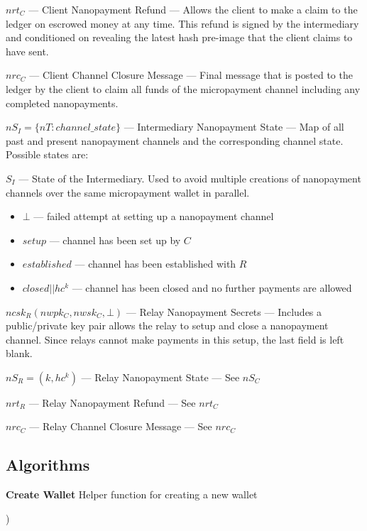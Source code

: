 $nrt_C$ --- Client Nanopayment Refund --- Allows the client to make a claim to the ledger on escrowed money at any time.
This refund is signed by the intermediary and conditioned on revealing the latest hash pre-image that the client claims to have sent.

$nrc_C$ --- Client Channel Closure Message --- Final message that is posted to the ledger by the client to claim all funds of the micropayment channel including any completed nanopayments.

$nS_I = \{nT: channel\_state\}$ --- Intermediary Nanopayment State --- Map of all past and present nanopayment channels and the corresponding channel state.
Possible states are:

$S_I$ --- State of the Intermediary.
Used to avoid multiple creations of nanopayment channels over the same micropayment wallet in parallel.

\begin{itemize}
\item $\bot$ --- failed attempt at setting up a nanopayment channel
\item $setup$ --- channel has been set up by $C$
\item $established$ --- channel has been established with $R$
\item $closed||hc^k$ --- channel has been closed and no further payments
  are allowed
\end{itemize}

$ncsk_R (nwpk_C, nwsk_C, \bot)$ --- Relay Nanopayment Secrets --- Includes a public/private key pair allows the relay to setup and close a nanopayment channel.
Since relays cannot make payments in this setup, the last field is left blank.

$nS_R = (k, hc^k)$ --- Relay Nanopayment State --- See $nS_C$

$nrt_R$ --- Relay Nanopayment Refund --- See $nrt_C$

$nrc_C$ --- Relay Channel Closure Message --- See $nrc_C$

\subsection{Algorithms}
\begin{algorithm}
  \caption[Create Wallet]{\textbf{Create Wallet} Helper function for creating a new wallet}
  \begin{algorithmic}[1]
    )
    \EndFunction{}
  \end{algorithmic}
\end{algorithm}

